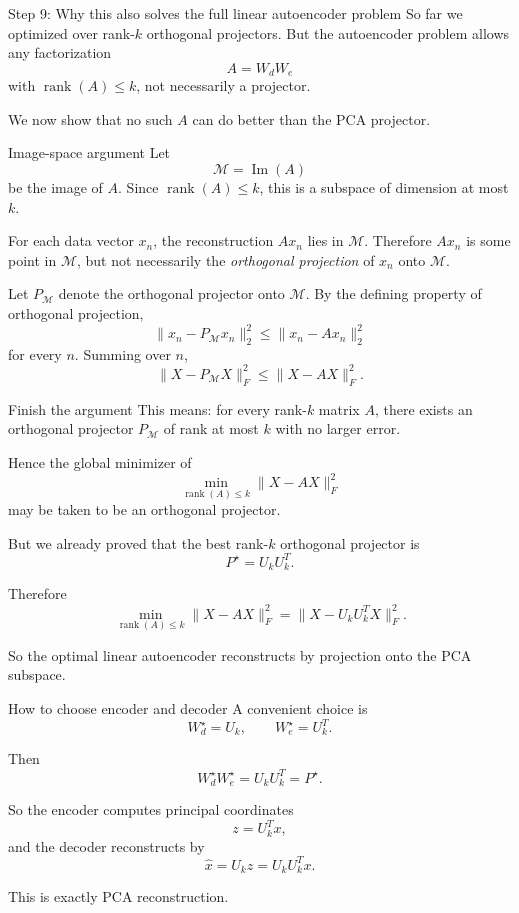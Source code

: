 \documentclass[aspectratio=169]{beamer}
\begin{document}
\begin{frame}{Step 9: Why this also solves the full linear autoencoder problem}
So far we optimized over rank-\(k\) orthogonal projectors.
But the autoencoder problem allows any factorization
\[
A = W_dW_e
\]
with \(\operatorname{rank}(A)\le k\), not necessarily a projector.

We now show that no such \(A\) can do better than the PCA projector.
\end{frame}

\begin{frame}{Image-space argument}
Let
\[
\mathcal M = \operatorname{Im}(A)
\]
be the image of \(A\). Since \(\operatorname{rank}(A)\le k\), this is a subspace of dimension at most \(k\).

For each data vector \(x_n\), the reconstruction \(Ax_n\) lies in \(\mathcal M\).
Therefore \(Ax_n\) is some point in \(\mathcal M\), but not necessarily the \emph{orthogonal projection} of \(x_n\) onto \(\mathcal M\).

Let \(P_{\mathcal M}\) denote the orthogonal projector onto \(\mathcal M\).
By the defining property of orthogonal projection,
\[
\|x_n - P_{\mathcal M}x_n\|_2^2 \le \|x_n - Ax_n\|_2^2
\]
for every \(n\).
\]
Summing over \(n\),
\[
\|X-P_{\mathcal M}X\|_F^2 \le \|X-AX\|_F^2.
\]
\end{frame}

\begin{frame}{Finish the argument}
This means: for every rank-\(k\) matrix \(A\), there exists an orthogonal projector \(P_{\mathcal M}\) of rank at most \(k\) with no larger error.

Hence the global minimizer of
\[
\min_{\operatorname{rank}(A)\le k}\|X-AX\|_F^2
\]
may be taken to be an orthogonal projector.

But we already proved that the best rank-\(k\) orthogonal projector is
\[
P^\star = U_kU_k^T.
\]

Therefore
\[
\min_{\operatorname{rank}(A)\le k}\|X-AX\|_F^2
=
\|X-U_kU_k^TX\|_F^2.
\]

So the optimal linear autoencoder reconstructs by projection onto the PCA subspace.
\end{frame}

\begin{frame}{How to choose encoder and decoder}
A convenient choice is
\[
W_d^\star = U_k,
\qquad
W_e^\star = U_k^T.
\]

Then
\[
W_d^\star W_e^\star = U_kU_k^T = P^\star.
\]

So the encoder computes principal coordinates
\[
z = U_k^T x,
\]
and the decoder reconstructs by
\[
\hat x = U_k z = U_kU_k^T x.
\]

This is exactly PCA reconstruction.
\end{frame}
\end{document}

